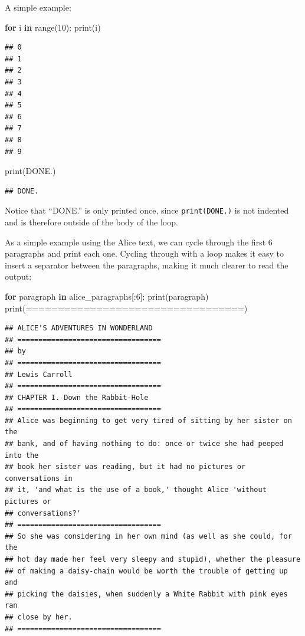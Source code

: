 \documentclass[
]{book}
\newenvironment{Shaded}{\begin{snugshade}}{\end{snugshade}}
\newcommand{\BuiltInTok}[1]{#1}
\newcommand{\ControlFlowTok}[1]{\textcolor[rgb]{0.13,0.29,0.53}{\textbf{#1}}}
\newcommand{\DecValTok}[1]{\textcolor[rgb]{0.00,0.00,0.81}{#1}}
\newcommand{\KeywordTok}[1]{\textcolor[rgb]{0.13,0.29,0.53}{\textbf{#1}}}
\newcommand{\NormalTok}[1]{#1}
\newcommand{\StringTok}[1]{\textcolor[rgb]{0.31,0.60,0.02}{#1}}
\begin{document}
A simple example:

\begin{Shaded}
\begin{Highlighting}[]
\ControlFlowTok{for}\NormalTok{ i }\KeywordTok{in} \BuiltInTok{range}\NormalTok{(}\DecValTok{10}\NormalTok{):}
    \BuiltInTok{print}\NormalTok{(i)}
\end{Highlighting}
\end{Shaded}

\begin{verbatim}
## 0
## 1
## 2
## 3
## 4
## 5
## 6
## 7
## 8
## 9
\end{verbatim}

\begin{Shaded}
\begin{Highlighting}[]
\BuiltInTok{print}\NormalTok{(}\StringTok{\textquotesingle{}DONE.\textquotesingle{}}\NormalTok{)}
\end{Highlighting}
\end{Shaded}

\begin{verbatim}
## DONE.
\end{verbatim}

Notice that ``DONE.'' is only printed once, since \texttt{print(\textquotesingle{}DONE.\textquotesingle{})} is not indented and is therefore outside of the body of the loop.

As a simple example using the Alice text, we can cycle through the first 6 paragraphs and print each one. Cycling through with a loop makes it easy to insert a separator between the paragraphs, making it much clearer to read the output:

\begin{Shaded}
\begin{Highlighting}[]
\ControlFlowTok{for}\NormalTok{ paragraph }\KeywordTok{in}\NormalTok{ alice\_paragraphs[:}\DecValTok{6}\NormalTok{]:}
    \BuiltInTok{print}\NormalTok{(paragraph)}
    \BuiltInTok{print}\NormalTok{(}\StringTok{\textquotesingle{}==================================\textquotesingle{}}\NormalTok{)}
\end{Highlighting}
\end{Shaded}

\begin{verbatim}
## ﻿ALICE'S ADVENTURES IN WONDERLAND
## ==================================
## by
## ==================================
## Lewis Carroll
## ==================================
## CHAPTER I. Down the Rabbit-Hole
## ==================================
## Alice was beginning to get very tired of sitting by her sister on the
## bank, and of having nothing to do: once or twice she had peeped into the
## book her sister was reading, but it had no pictures or conversations in
## it, 'and what is the use of a book,' thought Alice 'without pictures or
## conversations?'
## ==================================
## So she was considering in her own mind (as well as she could, for the
## hot day made her feel very sleepy and stupid), whether the pleasure
## of making a daisy-chain would be worth the trouble of getting up and
## picking the daisies, when suddenly a White Rabbit with pink eyes ran
## close by her.
## ==================================
\end{verbatim}
\end{document}
